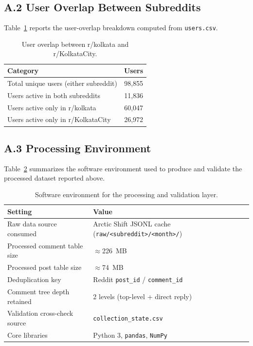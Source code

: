 \documentclass[12pt]{article}
\begin{document}
\subsection*{A.2 User Overlap Between Subreddits}
Table~\ref{tab:overlap} reports the user-overlap breakdown computed from \texttt{users.csv}.

\begin{table}[h]
\centering
\small
\caption{User overlap between r/kolkata and r/KolkataCity.}
\label{tab:overlap}
\begin{tabular}{lr}
\toprule
\textbf{Category} & \textbf{Users} \\
\midrule
Total unique users (either subreddit) & 98{,}855 \\
Users active in both subreddits & 11{,}836 \\
Users active only in r/kolkata & 60{,}047 \\
Users active only in r/KolkataCity & 26{,}972 \\
\bottomrule
\end{tabular}
\end{table}

\subsection*{A.3 Processing Environment}
Table~\ref{tab:env} summarizes the software environment used to produce and validate the
processed dataset reported above.

\begin{table}[h]
\centering
\caption{Software environment for the processing and validation layer.}
\label{tab:env}
\begin{tabular}{@{}lp{8.5cm}@{}}
\toprule
\textbf{Setting} & \textbf{Value} \\
\midrule
Raw data source consumed & Arctic Shift JSONL cache (\texttt{raw/<subreddit>/<month>/}) \\
Processed comment table size & $\approx$226~MB \\
Processed post table size & $\approx$74~MB \\
Deduplication key & Reddit \texttt{post\_id} / \texttt{comment\_id} \\
Comment tree depth retained & 2 levels (top-level + direct reply) \\
Validation cross-check source & \texttt{collection\_state.csv} \\
Core libraries & Python 3, \texttt{pandas}, \texttt{NumPy} \\
\bottomrule
\end{tabular}
\end{table}
\end{document}
